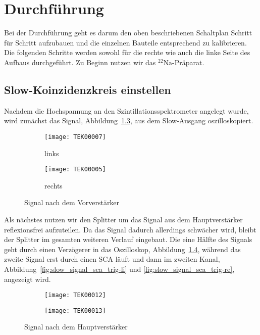 \documentclass[11pt, ngerman, fleqn, DIV=15, headinclude, BCOR=2cm]{scrreprt}
\begin{document}

\chapter{Durchführung}


Bei der Durchführung geht es darum den oben beschriebenen Schaltplan Schritt
für Schritt aufzubauen und die einzelnen Bauteile entsprechend zu
kalibrieren. Die folgenden Schritte werden sowohl für die rechte wie auch die
linke Seite des Aufbaus durchgeführt. Zu Beginn nutzen wir das
$^{22}\text{Na}$-Präparat. 

\section{Slow-Koinzidenzkreis einstellen}
Nachdem die Hochspannung an den Szintillationsspektrometer angelegt wurde, wird
zunächst das Signal, Abbildung~\ref{fig:slow_signal}, aus dem Slow-Ausgang oszilloskopiert.

\begin{figure}[htbp]
	\centering
	\begin{subfigure}{0.49 \textwidth}
		\texttt{[image: TEK00007]}
		\caption{%
			links
		}
		\label{fig:slow_signal-li}
	\end{subfigure}
	\begin{subfigure}{0.49 \textwidth}
		\texttt{[image: TEK00005]}
		\caption{%
			rechts
		}
		\label{fig:slow_signal-re}
	\end{subfigure}
	\caption{%
		Signal nach dem Vorverstärker
	}
	\label{fig:slow_signal}
\end{figure}

Als nächstes nutzen wir den Splitter um das Signal aus dem Hauptverstärker
reflexionsfrei aufzuteilen. Da das Signal dadurch allerdings schwächer wird,
bleibt der Splitter im gesamten weiteren Verlauf eingebaut. Die eine Hälfte des
Signals geht durch einen Verzögerer in das Oszilloskop, Abbildung~\ref{fig:slow_signal_hv}, während das zweite Signal erst
durch einen SCA läuft und dann im zweiten Kanal,
Abbildung~\ref{fig:slow_signal_sca_trig-li} und
\ref{fig:slow_signal_sca_trig-re}, angezeigt wird.

\begin{figure}[htbp]
	\centering
	\begin{subfigure}{0.49 \textwidth}
		\texttt{[image: TEK00012]}
	\end{subfigure}
	\begin{subfigure}{0.49 \textwidth}
		\texttt{[image: TEK00013]}
	\end{subfigure}
	\caption{%
		Signal nach dem Hauptverstärker
	}
	\label{fig:slow_signal_hv}
\end{figure}
\end{document}
